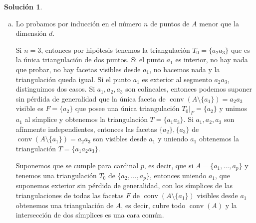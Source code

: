 \documentclass[10pt]{article}
\theoremstyle{definition}
\newtheorem*{sol}{Solución}
\newcommand{\conv}{\operatorname{conv}}
\begin{document}
\begin{sol}\leavevmode
\begin{enumerate}[(a)]
    \item Lo probamos por inducción en el número $n$ de puntos de $A$ menor que la dimensión $d$. 
    
    Si $n=3$, entonces por hipótesis tenemos la triangulación $T_0=\{a_2a_3\}$ que es la única triangulación de dos puntos. Si el punto $a_1$ es interior, no hay nada que probar, no hay facetas visibles desde $a_1$, no hacemos nada y la triangulación queda igual. Si el punto $a_1$ es exterior al segmento $a_2a_3$, distinguimos dos casos. Si $a_1,a_2,a_3$ son colineales, entonces podemos suponer sin pérdida de generalidad que la única faceta de $\conv\left(A\setminus\{a_1\}\right)=a_2a_3$ visible es $F=\{a_2\}$ que posee una única triangulación $T_0|_F=\{a_2\}$ y unimos $a_1$ al símplice y obtenemos la triangulación $T=\{a_1a_3\}$. Si $a_1,a_2,a_3$ son afínmente independientes, entonces las facetas $\{a_2\},\{a_3\}$ de $\conv\left(A\setminus\{a_1\}\right)=a_2a_3$ son visibles desde $a_1$ y uniendo $a_1$ obtenemos la triangulación $T=\{a_1a_2a_3\}$.
    
    Suponemos que se cumple para cardinal $p$, es decir, que si $A=\{a_1,\ldots, a_p\}$ y tenemos una triangulación $T_0$ de $\{a_2,\ldots, a_p\}$, entonces uniendo $a_1$, que suponemos exterior sin pérdida de generalidad, con los símplices de las triangulaciones de todas las facetas $F$ de $\conv\left(A\setminus\{a_1\}\right)$ visibles desde $a_1$ obtenemos una triangulación de $A$, es decir, cubre todo $\conv(A)$ y la intersección de dos símplices es una cara común.
    

\end{enumerate}
\end{sol}
\end{document}
